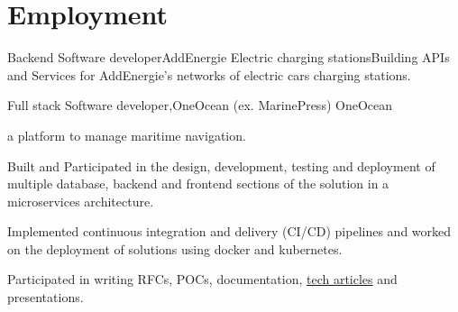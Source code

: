 \section{Employment}
  \resumeSubHeadingListStart
    \resumeSubheading
    {Backend Software developer}{AddEnergie}{}
    {}
      \resumeItemListStart
      \renewcommand{\labelitemii}{\raisebox{.2cm}{$\bullet$}}
        \resumeItem
        {Electric charging stations}{Building APIs and Services for AddEnergie's networks of electric cars charging stations.}
        \renewcommand{\labelitemii}{\scriptsize \raisebox{.25cm}{\ding{118}}}
      \resumeItemListEnd

    \resumeSubheading
    {Full stack Software developer,}{OneOcean (ex. MarinePress)}{}
    {}
      \resumeItemListStart
      \renewcommand{\labelitemii}{\raisebox{1.1cm}{$\bullet$}}
        \resumeItem
          {OneOcean} {a platform to manage maritime navigation.

          Built and Participated in the design, development, testing and deployment of multiple database, backend and frontend 
          sections of the solution in a microservices architecture. 
          
          Implemented continuous integration and delivery (CI/CD) pipelines and worked on the deployment of solutions using 
          docker and kubernetes.

          Participated in writing RFCs, POCs, documentation, \href{https://medium.com/oneoceangroup/publishing-and-consuming-debugging-symbols-for-net-core-library-d0e831f5862}{tech articles} and presentations.
          }
        \renewcommand{\labelitemii}{\scriptsize \raisebox{.25cm}{\ding{118}}}
      \resumeItemListEnd

